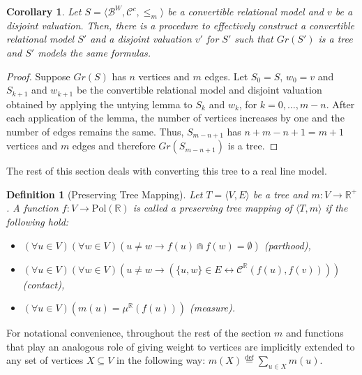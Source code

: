 \documentclass{article}
\newtheorem*{definition}{Definition}
\newtheorem*{corollary}{Corollary}
\newcommand{\R}{\mathbb{R}}
\newcommand{\B}{\mathcal{B}}
\newcommand{\bcap}{\Cap}
\newcommand{\bcont}{\mathcal{C}^\R}
\newcommand{\Pol}{\text{Pol}}
\newcommand{\eqdef}{\stackrel{\text{def}}{=}}
\begin{document}
\begin{corollary}
  Let $S = \langle \B^W, \mathcal{C}^c, \leq_m \rangle$ be a convertible relational model and $v$ be a disjoint valuation.
  Then, there is a procedure to effectively construct a convertible relational model $S'$ and a disjoint valuation $v'$ for $S'$ such that $Gr(S')$ is a tree and $S'$ models the same formulas.
\end{corollary}
\begin{proof}
  Suppose $Gr(S)$ has $n$ vertices and $m$ edges. Let $S_0 = S$, $w_0 = v$ and $S_{k+1}$ and $w_{k+1}$ be the convertible relational model and disjoint valuation obtained by applying the untying lemma to $S_k$ and $w_k$, for $k = 0, \dots, m - n$.
  After each application of the lemma, the number of vertices increases by one and the number of edges remains the same. Thus, $S_{m - n + 1}$ has $n + m - n + 1 = m + 1$ vertices and $m$ edges and therefore $Gr(S_{m - n + 1})$ is a tree.
\end{proof}

The rest of this section deals with converting this tree to a real line model.

\begin{definition}[Preserving Tree Mapping]
  Let $T = \langle V, E \rangle$ be a tree and $m : V \rightarrow \R^+$.
  A function $f : V \rightarrow \Pol(\R)$ is called a \emph{preserving tree mapping} of $\langle T, m \rangle$ if the following hold:
  \begin{itemize}
  \item $(\forall u \in V)(\forall w \in V)(u \neq w \rightarrow f(u) \bcap f(w) = \emptyset)$ (parthood),
  \item $(\forall u \in V)(\forall w \in V)(u \neq w \rightarrow (\{u, w\} \in E \leftrightarrow \bcont(f(u), f(v))))$ (contact),
  \item $(\forall u \in V)(m(u) = \mu^\R(f(u)))$ (measure).
  \end{itemize}
\end{definition}

For notational convenience, throughout the rest of the section $m$ and functions that play an analogous role of giving weight to vertices are implicitly extended to any set of vertices $X \subseteq V$ in the following way: $m(X) \eqdef \sum_{u \in X}m(u)$.
\end{document}
